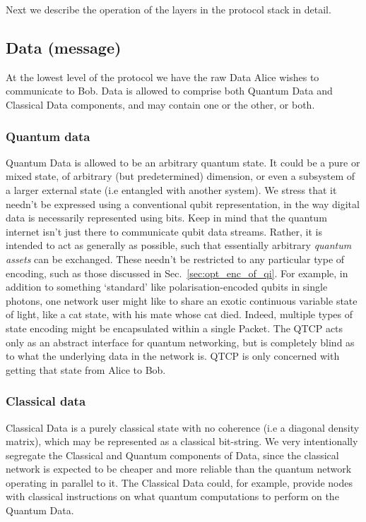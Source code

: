 \documentclass[aps,rmp,twocolumn,amsmath,amssymb,nofootinbib,superscriptaddress,longbibliography,floatfix]{revtex4-1}
\begin{document}
Next we describe the operation of the layers in the protocol stack in detail.

%
%

\subsection{Data (message)}

At the lowest level of the protocol we have the raw {\sc Data} Alice wishes to communicate to Bob. {\sc Data} is allowed to comprise both {\sc Quantum Data} and {\sc Classical Data} components, and may contain one or the other, or both.

%
%

\subsubsection{Quantum data}

{\sc Quantum Data} is allowed to be an arbitrary quantum state. It could be a pure or mixed state, of arbitrary (but predetermined) dimension, or even a subsystem of a larger external state (i.e entangled with another system). We stress that it needn't be expressed using a conventional qubit representation, in the way digital data is necessarily represented using bits. Keep in mind that the quantum internet isn't just there to communicate qubit data streams. Rather, it is intended to act as generally as possible, such that essentially arbitrary \emph{quantum assets} can be exchanged. These needn't be restricted to any particular type of encoding, such as those discussed in Sec.~\ref{sec:opt_enc_of_qi}. For example, in addition to something `standard' like polarisation-encoded qubits in single photons, one network user might like to share an exotic continuous variable state of light, like a cat state, with his mate whose cat died. Indeed, multiple types of state encoding might be encapsulated within a single {\sc Packet}. The QTCP acts only as an abstract interface for quantum networking, but is completely blind as to what the underlying data in the network is. QTCP is only concerned with getting that state from Alice to Bob.

%
%

\subsubsection{Classical data}

{\sc Classical Data} is a purely classical state with no coherence (i.e a diagonal density matrix), which may be represented as a classical bit-string. We very intentionally segregate the {\sc Classical} and {\sc Quantum} components of {\sc Data}, since the classical network is expected to be cheaper and more reliable than the quantum network operating in parallel to it. The {\sc Classical Data} could, for example, provide nodes with classical instructions on what quantum computations to perform on the {\sc Quantum Data}.
\end{document}
